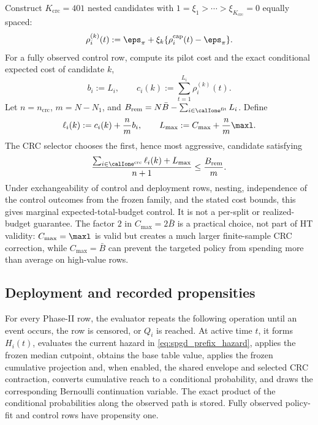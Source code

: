 Construct $K_{\mathrm{crc}}=401$ nested candidates with
$1=\xi_1>\cdots>\xi_{K_{\mathrm{crc}}}=0$ equally spaced:
\begin{equation}
    \rho_i^{(k)}(t)
    :=\eps_\pi+\xi_k
      \{\rho_i^{\mathrm{cap}}(t)-\eps_\pi\}.
    \label{eq:spgd_crc_candidates}
\end{equation}
For a fully observed control row, compute its pilot cost and the exact
conditional expected cost of candidate $k$,
\begin{equation}
    b_i:=L_i,
    \qquad
    c_i(k):=\sum_{t=1}^{L_i}\rho_i^{(k)}(t).
\end{equation}
Let $n=n_{\mathrm{crc}}$, $m=N-N_1$, and
$B_{\mathrm{rem}}=N\bar B-
\sum_{i\in\calIone^{\mathrm{fit}}}L_i$.  Define
\begin{equation}
    \ell_i(k):=c_i(k)+\frac{n}{m}b_i,
    \qquad
    L_{\max}:=C_{\max}+\frac{n}{m}\maxl.
\end{equation}
The CRC selector chooses the first, hence most aggressive, candidate satisfying
\begin{equation}
    \frac{\sum_{i\in\calIone^{\mathrm{crc}}}\ell_i(k)+L_{\max}}
         {n+1}
    \leq\frac{B_{\mathrm{rem}}}{m}.
    \label{eq:spgd_crc_rule}
\end{equation}
Under exchangeability of control and deployment rows, nesting, independence of
the control outcomes from the frozen family, and the stated cost bounds, this
gives marginal expected-total-budget control.  It is not a per-split or
realized-budget guarantee.  The factor $2$ in $C_{\max}=2\bar B$ is a practical
choice, not part of HT validity: $C_{\max}=\maxl$ is valid but creates a much
larger finite-sample CRC correction, while $C_{\max}=\bar B$ can prevent the
targeted policy from spending more than average on high-value rows.

\subsection{Deployment and recorded propensities}

For every Phase-II row, the evaluator repeats the following operation until
an event occurs, the row is censored, or $Q_i$ is reached.  At active time
$t$, it forms $H_i(t)$, evaluates the current hazard in
\eqref{eq:spgd_prefix_hazard}, applies the frozen median cutpoint, obtains the
base table value, applies the frozen cumulative projection and, when enabled,
the shared envelope and selected CRC contraction, converts cumulative reach
to a conditional probability, and draws the corresponding Bernoulli
continuation variable.  The exact product of the conditional probabilities
along the observed path is stored.  Fully observed policy-fit and control rows
have propensity one.

